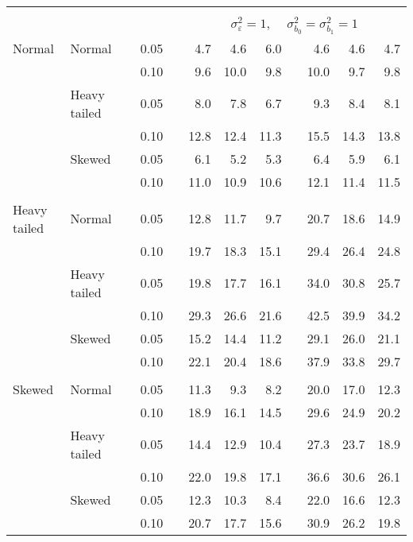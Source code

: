 \begin{table}[ht]
\begin{scriptsize}
\begin{tabular}{ll p{.1cm} c p{.1cm} rrr p{.1cm} rrr}
&&&&&&&&&&&\\
& && && \multicolumn{7}{c}{$\sigma_{\varepsilon}^2 = 1$, \ \ $\sigma_{b_0}^2 = \sigma_{b_1}^2 = 1$} \\ \cline{6-12}
\rowcolor{gray!20} Normal & Normal &  & 0.05 &  & 4.7 & 4.6 & 6.0 &  & 4.6 & 4.6 & 4.7 \\ 
\rowcolor{gray!20}   &  &  & 0.10 &  & 9.6 & 10.0 & 9.8 &  & 10.0 & 9.7 & 9.8 \\ 
\rowcolor{gray!20}   & Heavy tailed &  & 0.05 &  & 8.0 & 7.8 & 6.7 &  & 9.3 & 8.4 & 8.1 \\ 
\rowcolor{gray!20}   &  &  & 0.10 &  & 12.8 & 12.4 & 11.3 &  & 15.5 & 14.3 & 13.8 \\ 
\rowcolor{gray!20}   & Skewed &  & 0.05 &  & 6.1 & 5.2 & 5.3 &  & 6.4 & 5.9 & 6.1 \\ 
\rowcolor{gray!20}   &  &  & 0.10 &  & 11.0 & 10.9 & 10.6 &  & 12.1 & 11.4 & 11.5 \\ 
&&&&&&&&&&&\\
  Heavy tailed & Normal &  & 0.05 &  & 12.8 & 11.7 & 9.7 &  & 20.7 & 18.6 & 14.9 \\ 
   &  &  & 0.10 &  & 19.7 & 18.3 & 15.1 &  & 29.4 & 26.4 & 24.8 \\ 
   & Heavy tailed &  & 0.05 &  & 19.8 & 17.7 & 16.1 &  & 34.0 & 30.8 & 25.7 \\ 
   &  &  & 0.10 &  & 29.3 & 26.6 & 21.6 &  & 42.5 & 39.9 & 34.2 \\ 
   & Skewed &  & 0.05 &  & 15.2 & 14.4 & 11.2 &  & 29.1 & 26.0 & 21.1 \\ 
   &  &  & 0.10 &  & 22.1 & 20.4 & 18.6 &  & 37.9 & 33.8 & 29.7 \\ 
 &&&&&&&&&&&\\
  Skewed & Normal &  & 0.05 &  & 11.3 & 9.3 & 8.2 &  & 20.0 & 17.0 & 12.3 \\ 
   &  &  & 0.10 &  & 18.9 & 16.1 & 14.5 &  & 29.6 & 24.9 & 20.2 \\ 
   & Heavy tailed &  & 0.05 &  & 14.4 & 12.9 & 10.4 &  & 27.3 & 23.7 & 18.9 \\ 
   &  &  & 0.10 &  & 22.0 & 19.8 & 17.1 &  & 36.6 & 30.6 & 26.1 \\ 
   & Skewed &  & 0.05 &  & 12.3 & 10.3 & 8.4 &  & 22.0 & 16.6 & 12.3 \\ 
   &  &  & 0.10 &  & 20.7 & 17.7 & 15.6 &  & 30.9 & 26.2 & 19.8 \\ 


\end{tabular}
\end{scriptsize}
\end{table}
